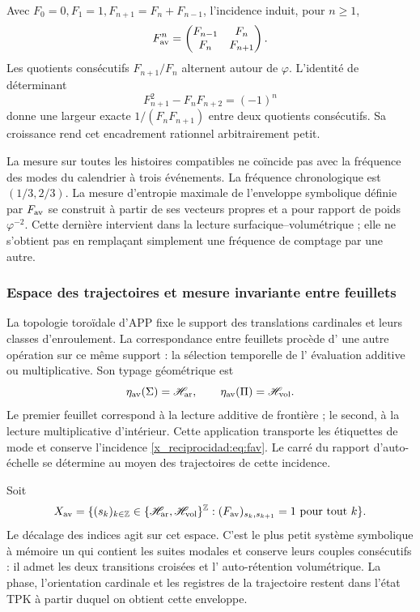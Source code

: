 Avec \(F_0=0,F_1=1,F_{n+1}=F_n+F_{n-1}\), l'incidence induit, pour \(n\geq1\),
\[
 F_{\rm av}^n=\begin{pmatrix}F_{n-1}&F_n\\F_n&F_{n+1}\end{pmatrix}.
\]
Les quotients consécutifs \(F_{n+1}/F_n\) alternent autour de \(\varphi\). L'identité de déterminant
\[
 F_{n+1}^2-F_nF_{n+2}=(-1)^n
\]
donne une largeur exacte \(1/(F_nF_{n+1})\) entre deux quotients consécutifs. Sa croissance rend cet encadrement rationnel arbitrairement petit.

La mesure sur toutes les histoires compatibles ne coïncide pas avec la fréquence des modes du calendrier à trois événements. La fréquence chronologique est \((1/3,2/3)\). La mesure d'entropie maximale de l'enveloppe symbolique définie par \(F_{\rm av}\) se construit à partir de ses vecteurs propres et a pour rapport de poids \(\varphi^{-2}\). Cette dernière intervient dans la lecture surfacique--volumétrique ; elle ne s'obtient pas en remplaçant simplement une fréquence de comptage par une autre.


\subsubsection{Espace des trajectoires et mesure invariante entre feuillets}
\label{x_reciprocidad:sec:medida-retorno-hojas}

La topologie toroïdale d'APP fixe le support des translations cardinales
et leurs classes d'enroulement. La correspondance entre feuillets procède d'
une autre opération sur ce même support : la sélection temporelle de l'
évaluation additive ou multiplicative. Son typage géométrique est
\[
 \eta_{\rm av}(\Sigma)=\mathscr H_{\rm ar},\qquad
 \eta_{\rm av}(\Pi)=\mathscr H_{\rm vol}.
\]
Le premier feuillet correspond à la lecture additive de frontière ; le second,
à la lecture multiplicative d'intérieur. Cette application transporte les étiquettes
de mode et conserve l'incidence \eqref{x_reciprocidad:eq:fav}. Le carré du rapport
d'auto-échelle se détermine au moyen des trajectoires de cette incidence.

\begin{definition}
Soit
\[
 X_{\rm av}=\{(s_k)_{k\in\mathbb Z}\in
 \{\mathscr H_{\rm ar},\mathscr H_{\rm vol}\}^{\mathbb Z}:
 (F_{\rm av})_{s_k,s_{k+1}}=1\text{ pour tout }k\}.
\]
Le décalage des indices agit sur cet espace. C'est le plus petit système
symbolique à mémoire un qui contient les suites modales et conserve
leurs couples consécutifs : il admet les deux transitions croisées et l'
auto-rétention volumétrique. La phase, l'orientation cardinale et les registres
de la trajectoire restent dans l'état TPK à partir duquel on obtient cette
enveloppe.
\end{definition}

